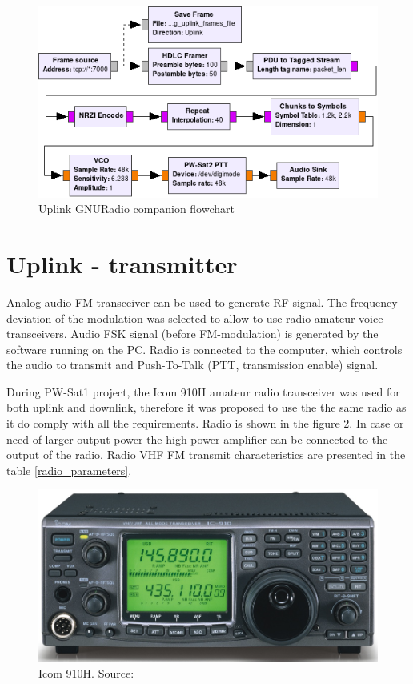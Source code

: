 \begin{figure}
    \centering
    \includegraphics[width=0.8\paperwidth]{img/7/uplink_flowgraph.png}
    \caption{Uplink GNURadio companion flowchart}
    \label{uplink_flowgraph}
\end{figure}


\section{Uplink - transmitter}
Analog audio FM transceiver can be used to generate RF signal. The frequency deviation of the modulation was selected to allow to use radio amateur voice transceivers. Audio FSK signal (before FM-modulation) is generated by the software running on the PC. Radio is connected to the computer, which controls the audio to transmit and Push-To-Talk (PTT, transmission enable) signal.

During PW-Sat1 project, the Icom 910H amateur radio transceiver was used for both uplink and downlink, therefore it was proposed to use the the same radio as it do comply with all the requirements. Radio is shown in the figure \ref{Icom_910H_ref}. In case or need of larger output power the high-power amplifier can be connected to the output of the radio. Radio VHF FM transmit characteristics are presented in the table \ref{radio_parameters}.

\begin{figure}[h]
    \centering
    \includegraphics[width=0.6\paperwidth]{img/7/icom910h.jpg}
    \caption{Icom 910H. Source: \cite{ICOM_910H_pic}}
    \label{Icom_910H_ref}
\end{figure}

